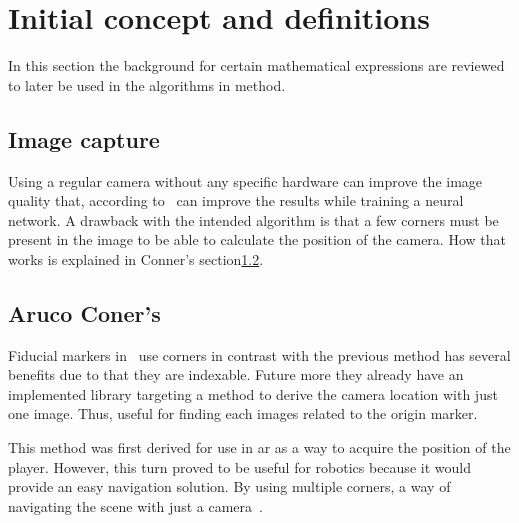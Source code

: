 \section{Initial concept and definitions}
\label{sec:background}


In this section the background for certain mathematical expressions are reviewed to later be used in the algorithms in method.



\subsection{Image capture}%
\label{sub:Image_capture}
Using a regular camera without any specific hardware can improve the image quality that, according to~\cite{jeelani2018image} can improve the results while training a neural network.
A drawback with the intended algorithm is that a few \aruco{} corners must be present in the image to be able to calculate the position of the camera.
How that works is explained in \aruco{} Conner's section\ref{sub:ArucoConers}.


\subsection{Aruco Coner's}%
\label{sub:ArucoConers}
Fiducial markers in~\cite{romero2018speeded} use \aruco corners in contrast with the previous method has several benefits due to that they are indexable.
Future more they already have an implemented library targeting a method to derive the camera location with just one image.
Thus, useful for finding each images related to the origin \aruco marker.

This method was first derived for use in \ac{ar} as a way to acquire the position of the player.
However, this turn proved to be useful for robotics because it would provide an easy navigation solution.
By using multiple \aruco corners, a way of navigating the scene with just a camera~\cite{zheng2018vlocaruco}.

